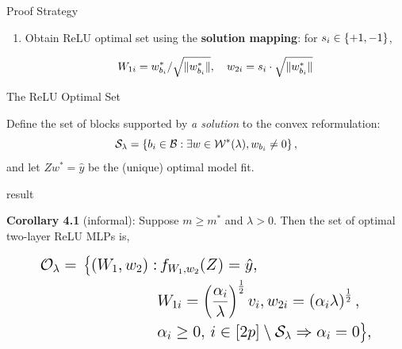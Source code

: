 \documentclass[12pt, usenames, dvipsnames]{beamer}
\newlength{\colwidth}
\begin{document}
\begin{frame}[t]
\begin{columns}[t]
\begin{column}{\colwidth}
\begin{block}{Proof Strategy}
\begin{enumerate}
					\item Obtain ReLU optimal set using the \textbf{solution mapping}: for \( s_i \in \left\{+1, -1\right\} \),

					      { \Large
							      \begin{equation*}\label{eq:convex-to-relu}
								      W_{1i} = w_{b_i}^*/ \sqrt{\|w_{b_i}^*\|}, \quad w_{2i} = s_i \cdot \sqrt{\|w_{b_i}^*\|}
							      \end{equation*}
						      }

				\end{enumerate}

			\end{block}

			\vspace{-1em}
			\begin{block}{The ReLU Optimal Set}

				\large

				Define the set of blocks supported by \emph{a solution} to the convex reformulation:
				\[
					\mathcal{S}_\lambda = \left\{{b_i} \in \mathcal{B} : \exists w \in \mathcal{W}^*(\lambda), w_{b_i} \neq 0\right\},
				\]
				and let \( Z w^* = \hat y \) be the (unique) optimal model fit.

				\vspace{1em}

				\begin{beamercolorbox}[wd=\textwidth,sep=1em]{result}

					\textbf{Corollary 4.1} (informal):
					Suppose \( m \geq m^* \) and \( \lambda > 0 \).
					Then the set of optimal two-layer ReLU MLPs is,

					\begin{equation*}\label{eq:relu-sol-fn}
						\Large
						\begin{aligned}
							\mathcal{O}_\lambda  = \,
							\big\{
							(W_1,  w_2) : &
							\, f_{W_1, w_2}(Z)  =  \hat y,                                                                  \\
							              & W_{1i} = \left(\frac{\alpha_{i}}{\lambda}\right)^{\frac{1}{2}} v_i,
							w_{2i} = \left(\alpha_i \lambda\right)^{\frac{1}{2}},                                                  \\
							              & \alpha_i \geq 0, \, i \in [2p] \setminus \mathcal{S}_\lambda \Rightarrow \alpha_i = 0
							\big\},
						\end{aligned}
					\end{equation*}
				\end{beamercolorbox}


\end{block}
\end{column}
\end{columns}
\end{frame}
\end{document}

